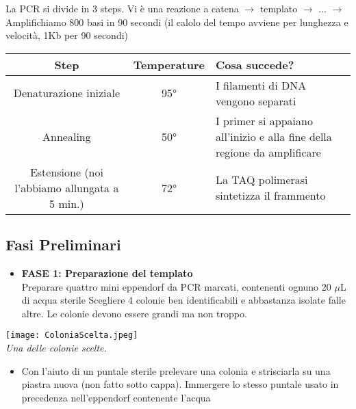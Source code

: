 \documentclass{extarticle}
\begin{document}
\newpage
La PCR si divide in 3 steps. Vi è una reazione a catena $\rightarrow$ templato $\rightarrow$ ... $\rightarrow$  Amplifichiamo 800 basi in 90 secondi (il calolo del tempo avviene per lunghezza e velocità, 1Kb per 90 secondi)
\begin{center}
    \begin{longtable}[c]{ccp{5cm}}
        \hline
        \textbf{Step} & \textbf{Temperature} & Cosa succede? \\
        \hline
        Denaturazione iniziale & 95° & I filamenti di DNA vengono separati\\
        Annealing & 50° & I primer si appaiano all'inizio e alla fine della regione da amplificare \\
        Estensione (noi l'abbiamo allungata a 5 min.) & 72° & La TAQ polimerasi sintetizza il frammento \\
        \hline
    \end{longtable}
\end{center}

\subsection*{Fasi Preliminari}
\begin{itemize}
    \item \textbf{FASE 1: Preparazione del templato}\\
    Preparare quattro mini eppendorf da PCR marcati, contenenti ognuno 20 $\mu$L di acqua sterile 
        \subitem{ - } Scegliere 4 colonie ben identificabili e abbastanza isolate falle altre. Le colonie devono essere grandi ma non troppo.
\end{itemize}
\begin{center}
    \texttt{[image: ColoniaScelta.jpeg]}\\
    \emph{Una delle colonie scelte.}
\end{center}
\begin{itemize}
    \item[]
        \subitem{ - } Con l'aiuto di un puntale sterile prelevare una colonia e strisciarla su una piastra nuova (non fatto sotto cappa).
        \subitem{ - } Immergere lo stesso puntale usato in precedenza nell'eppendorf contenente l'acqua 
\end{itemize}
\end{document}
